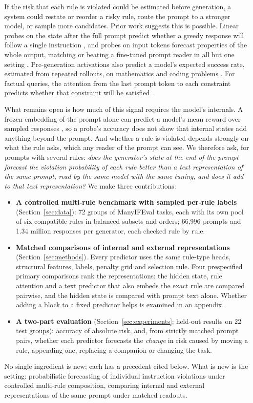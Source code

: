 \documentclass{article}
\begin{document}
If the risk that each rule is violated could be estimated before generation, a system could restate or reorder a
risky rule, route the prompt to a stronger model, or sample more candidates. Prior work suggests this is possible. Linear probes on the state after the full prompt predict whether a greedy response will follow a
single instruction \citep{heo2025know}, and probes on input tokens forecast properties of the whole output, matching
or beating a fine-tuned prompt reader in all but one setting \citep{ashok2025predict}. Pre-generation activations also predict a model's
expected success rate, estimated from repeated rollouts, on mathematics and coding problems
\citep{lugoloobi2026encode}. For factual queries, the attention from the last prompt token to each constraint
predicts whether that constraint will be satisfied \citep{yuksekgonul2024attention}.

What remains open is how much of this signal requires the model's internals. A frozen embedding of the prompt alone
can predict a model's mean reward over sampled responses \citep{hasanaliyev2026expected}, so a probe's accuracy does
not show that internal states add anything beyond the prompt. And whether a rule is violated depends strongly on what
the rule asks, which any reader of the prompt can see. We therefore ask, for prompts with several rules: \emph{does the
generator's state at the end of the prompt forecast the violation probability of each rule better than a text
representation of the same prompt, read by the same model with the same tuning, and does it add to that text
representation?} We make three contributions:
\begin{itemize}
\item \textbf{A controlled multi-rule benchmark with sampled per-rule labels} (Section~\ref{sec:data}): 72 groups
of ManyIFEval tasks, each with its own pool of six compatible rules in balanced subsets and orders; 66,996 prompts and
1.34 million responses per generator, each checked rule by rule.
\item \textbf{Matched comparisons of internal and external representations} (Section~\ref{sec:methods}). Every
predictor uses the same rule-type heads, structural features, labels, penalty grid and selection rule. Four prespecified primary
comparisons rank the representations: the hidden state, rule attention and a text predictor that also embeds the
exact rule are compared pairwise, and the hidden state is compared with prompt text alone. Whether adding a block to a
fixed predictor helps is examined in an appendix.
\item \textbf{A two-part evaluation} (Section~\ref{sec:experiments}; held-out results on 22 test groups): accuracy of absolute risk, and, from strictly matched prompt pairs, whether each predictor forecasts the \emph{change} in risk caused by
moving a rule, appending one, replacing a companion or changing the task.
\end{itemize}
No single ingredient is new; each has a precedent cited below. What is new is the setting: probabilistic forecasting
of individual instruction violations under controlled multi-rule composition, comparing internal and external
representations of the same prompt under matched readouts.
\end{document}
